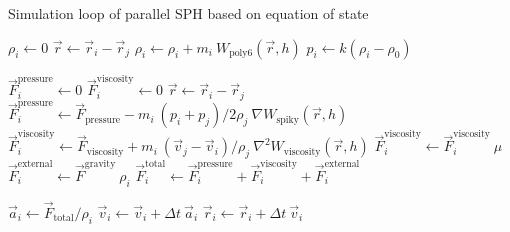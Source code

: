 \documentclass[a4paper, 12pt, oneside]{book}
\begin{document}
\begin{algorithm}
    \caption{Simulation loop of parallel SPH based on equation of state}
    \label{alg:simulation loop}
    \begin{algorithmic}[1]
         
            \State \(\rho_{i} \gets 0\)
                \State \(\vec{r} \gets \vec{r}_{i} - \vec{r}_{j}\)
                    \State \(\rho_{i} \gets \rho_{i} + m_{i} \  W_{\mathrm{poly6}}(\vec{r}, h)\)
                \EndIf
            \EndFor
            \State \(p_{i} \gets k (\rho_{i} - \rho_{0}) \)
        \EndParallelFor

    \end{algorithmic}
\end{algorithm}

\begin{algorithm}[ht]
    \begin{algorithmic}[1]

         
            \State \( \vec{F}_{i}^{\mathrm{pressure}} \gets 0 \)
            \State \( \vec{F}_{i}^{\mathrm{viscosity}} \gets 0 \)
                    \State \(\vec{r} \gets \vec{r}_{i} - \vec{r}_{j}\)
                        \State \( \vec{F}_{i}^{\mathrm{pressure}} \gets \vec{F}_{\mathrm{pressure}} - m_{i} \  (p_{i} + p_{j}) / 2 \rho_{j} \  \nabla W_{\mathrm{spiky}}(\vec{r}, h) \)
                        \State \( \vec{F}_{i}^{\mathrm{viscosity}} \gets \vec{F}_{\mathrm{viscosity}} + m_{i} \  (\vec{v}_{j} - \vec{v}_{i} ) / \rho_{j} \  \nabla^{2} W_{\mathrm{viscosity}}(\vec{r}, h) \)
                    \EndIf
                \EndIf
            \EndFor
            \State \( \vec{F}_{i}^{\mathrm{viscosity}} \gets \vec{F}_{i}^{\mathrm{viscosity}} \  \mu \)
            \State \( \vec{F}_{i}^{\mathrm{external}} \gets \vec{F}^{\mathrm{gravity}} \  \rho_{i}\)
            \State \( \vec{F}_{i}^{\mathrm{total}} \gets \vec{F}_{i}^{\mathrm{pressure}} + \vec{F}_{i}^{\mathrm{viscosity}} + \vec{F}_{i}^{\mathrm{external}} \)
        \EndParallelFor
    
         
            \State \( \vec{a}_{i} \gets \vec{F}_{\mathrm{total}} / \rho_{i} \)
            \State \( \vec{v}_{i} \gets \vec{v}_{i} + \Delta t \ \vec{a}_{i} \)
            \State \( \vec{r}_{i} \gets \vec{r}_{i} + \Delta t \ \vec{v}_{i} \)
        \EndParallelFor
    \end{algorithmic}
\end{algorithm}
\end{document}
